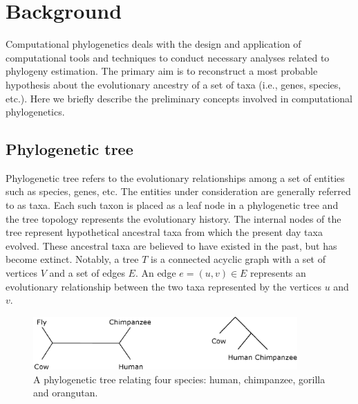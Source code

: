 \chapter{Background}
\label{ch:background}



\graphicspath{{snoga/}}
Computational phylogenetics deals with the design and application of computational tools and techniques to conduct necessary analyses related to phylogeny estimation. The primary aim is to reconstruct a most probable hypothesis about the evolutionary ancestry of a set of taxa (i.e., genes, species, etc.). Here we briefly describe the preliminary concepts involved in computational phylogenetics. 
\section{Phylogenetic tree}
Phylogenetic tree refers to the evolutionary relationships among a set of entities such as species, genes, etc. The entities under consideration are generally referred to as taxa. Each such taxon is placed as a leaf node in a phylogenetic tree and the tree topology represents the evolutionary history. The  internal nodes of the tree represent hypothetical ancestral taxa from which the present day taxa evolved. These ancestral taxa are believed to have existed in the past, but has become extinct. Notably, a tree $T$ is a connected acyclic graph with a set of vertices $V$ and a set of edges $E$. An edge $e = (u, v) \in E$ represents an evolutionary relationship between the two taxa represented by the vertices $u$ and $v$. 

\begin{figure}[!htbp]
\centering
\includegraphics[width=0.9\textwidth]{Figure/outgroup.eps}
\caption{A phylogenetic tree relating four species: human, chimpanzee, gorilla and orangutan. }
\label{fig:outgroup}
\end{figure}


